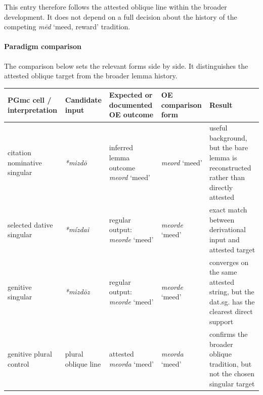 \documentclass[
  british,
  a4paper,
]{article}
\newcounter{none} %
\begin{document}
This entry therefore follows the attested oblique line within the
broader development. It does not depend on a full decision about the
history of the competing {\emph{mēd}} `meed, reward' tradition.

\paragraph{Paradigm comparison}\label{paradigm-comparison-10}

The comparison below sets the relevant forms side by side. It
distinguishes the attested oblique target from the broader lemma
history.

{\def\LTcaptype{none} %
\begin{longtable}[]{@{}
  >{\raggedright\arraybackslash}p{}
  >{\raggedright\arraybackslash}p{}
  >{\raggedright\arraybackslash}p{}
  >{\raggedright\arraybackslash}p{}
  >{\raggedright\arraybackslash}p{}@{}}
\toprule\noalign{}
\begin{minipage}[b]{\linewidth}\raggedright
PGmc cell / interpretation
\end{minipage} & \begin{minipage}[b]{\linewidth}\raggedright
Candidate input
\end{minipage} & \begin{minipage}[b]{\linewidth}\raggedright
Expected or documented OE outcome
\end{minipage} & \begin{minipage}[b]{\linewidth}\raggedright
OE comparison form
\end{minipage} & \begin{minipage}[b]{\linewidth}\raggedright
Result
\end{minipage} \\
\midrule\noalign{}
\endhead
\bottomrule\noalign{}
\endlastfoot
citation nominative singular & {\emph{*mizdō}} & inferred lemma outcome
{\emph{meord}} `meed' & {\emph{meord}} `meed' & useful background, but
the bare lemma is reconstructed rather than directly attested \\
selected dative singular & {\emph{*mízdai}} & regular output:
{\emph{meorde}} `meed' & {\emph{meorde}} `meed' & exact match between
derivational input and attested target \\
genitive singular & {\emph{*mizdōz}} & regular output: {\emph{meorde}}
`meed' & {\emph{meorde}} `meed' & converges on the same attested string,
but the dat.sg. has the clearest direct support \\
genitive plural control & plural oblique line & attested {\emph{meorda}}
`meed' & {\emph{meorda}} `meed' & confirms the broader oblique
tradition, but not the chosen singular target \\
\end{longtable}
}
\end{document}
